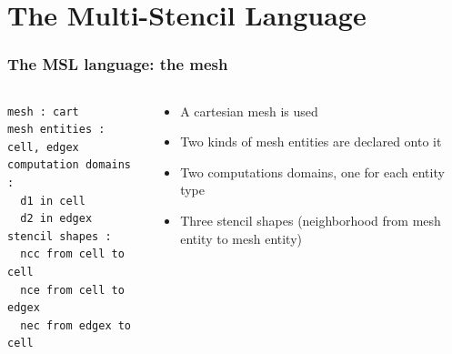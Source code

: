 \documentclass{beamer}
\begin{document}
\section{The Multi-Stencil Language}
\begin{frame}[fragile]
\frametitle{The MSL language: the mesh}
\begin{center}
\end{center}
\begin{columns}
\begin{column}{6.5cm}
  \begin{lstlisting}[frame=single]
mesh : cart
mesh entities : cell, edgex
computation domains :
  d1 in cell
  d2 in edgex
stencil shapes : 
  ncc from cell to cell
  nce from cell to edgex
  nec from edgex to cell
\end{lstlisting}
\end{column}
\begin{column}{5.5cm}
\begin{itemize}
\item A cartesian mesh is used
\item Two kinds of mesh entities are declared onto it
\item Two computations domains, one for each entity type
\item Three stencil shapes (neighborhood from mesh entity to mesh entity)
\end{itemize}
\end{column}
\end{columns}
\end{frame}
\end{document}
